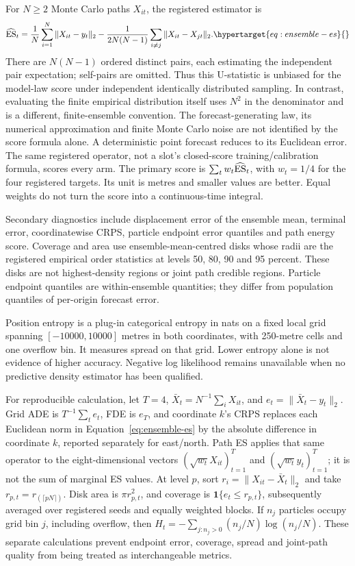 For \(N\geq2\) Monte Carlo paths \(X_{it}\), the registered estimator is
\begin{equation}
 \widehat{\ES}_t=\frac1N\sum_{i=1}^N\|X_{it}-y_t\|_2
  -\frac{1}{2N(N-1)}\sum_{i\ne j}\|X_{it}-X_{jt}\|_2.
 \label{eq:ensemble-es}\hypertarget{eq:ensemble-es}{}
\end{equation}
There are \(N(N-1)\) ordered distinct pairs, each estimating the independent
pair expectation; self-pairs are omitted. Thus this U-statistic is unbiased
for the model-law score under independent identically distributed sampling.
In contrast, evaluating the finite empirical distribution itself uses
\(N^2\) in the denominator and is a different, finite-ensemble convention.
The forecast-generating law, its numerical approximation and finite Monte
Carlo noise are not identified by the score formula alone. A deterministic
point forecast reduces to its Euclidean error. The same registered operator,
not a slot's closed-score training/calibration formula, scores every arm.
The primary score is \(\sum_t w_t\widehat{\operatorname{ES}}_t\), with \(w_t=1/4\) for
the four registered targets. Its unit is metres and smaller values are better.
Equal weights do not turn the score into a continuous-time integral.

Secondary diagnostics include displacement error of the ensemble mean,
terminal error, coordinatewise CRPS, particle endpoint error quantiles and
path energy score. Coverage and area use ensemble-mean-centred disks whose
radii are the registered empirical order statistics at levels 50, 80, 90
and 95 percent. These disks are not highest-density regions or joint path
credible regions. Particle endpoint quantiles are within-ensemble quantities;
they differ from population quantiles of per-origin forecast error.

Position entropy is a plug-in categorical entropy in nats on a fixed local
grid spanning \([-10000,10000]\) metres in both coordinates, with 250-metre
cells and one overflow bin. It measures spread on that grid. Lower entropy
alone is not evidence of higher accuracy. Negative log likelihood remains
unavailable when no predictive density estimator has been qualified.

For reproducible calculation, let \(T=4\),
\(\bar X_t=N^{-1}\sum_iX_{it}\), and \(e_t=\|\bar X_t-y_t\|_2\).
Grid ADE is \(T^{-1}\sum_t e_t\), FDE is \(e_T\), and coordinate \(k\)'s
CRPS replaces each Euclidean norm in Equation~\eqref{eq:ensemble-es} by the
absolute difference in coordinate \(k\), reported separately for east/north.
Path ES applies that same operator to the eight-dimensional vectors
\((\sqrt{w_t}X_{it})_{t=1}^T\) and \((\sqrt{w_t}y_t)_{t=1}^T\);
it is not the sum of marginal ES values.
At level \(p\), sort \(r_i=\|X_{it}-\bar X_t\|_2\) and take
\(r_{p,t}=r_{(\lceil pN\rceil)}\). Disk area is \(\pi r_{p,t}^2\), and
coverage is \(\mathbf1\{e_t\leq r_{p,t}\}\), subsequently averaged over
registered seeds and equally weighted blocks. If \(n_j\) particles occupy
grid bin \(j\), including overflow, then
\(H_t=-\sum_{j:n_j>0}(n_j/N)\log(n_j/N)\).
These separate calculations prevent endpoint error, coverage, spread and
joint-path quality from being treated as interchangeable metrics.


